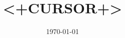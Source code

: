 \documentclass{jreport}
\title{<+CURSOR+>}
\author{}
\date{\today}
\begin{document}
\maketitle


\section*{}
\end{document}
